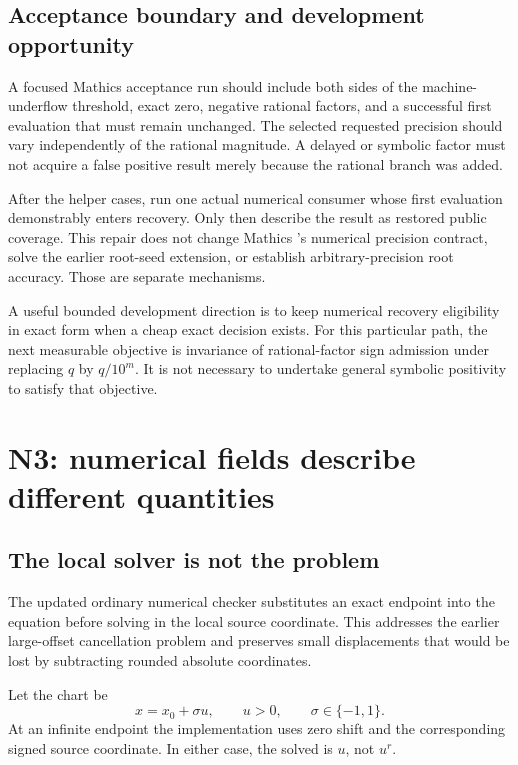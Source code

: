 \documentclass[11pt,letterpaper]{article}
\newcommand{\code}[1]{\texttt{\detokenize{#1}}}
\begin{document}
\subsection{Acceptance boundary and development opportunity}
A focused Mathics acceptance run should include both sides of the machine-underflow threshold, exact zero, negative rational factors, and a successful first evaluation that must remain unchanged. The selected requested precision should vary independently of the rational magnitude. A delayed or symbolic factor must not acquire a false positive result merely because the rational branch was added.

After the helper cases, run one actual numerical consumer whose first evaluation demonstrably enters recovery. Only then describe the result as restored public coverage. This repair does not change Mathics \code{FindRoot}'s numerical precision contract, solve the earlier root-seed extension, or establish arbitrary-precision root accuracy. Those are separate mechanisms.~\cite{mathicsnum,wave4,wave5}

A useful bounded development direction is to keep numerical recovery eligibility in exact form when a cheap exact decision exists. For this particular path, the next measurable objective is invariance of rational-factor sign admission under replacing $q$ by $q/10^m$. It is not necessary to undertake general symbolic positivity to satisfy that objective.

\section{N3: numerical fields describe different quantities}
\label{sec:n3}

\subsection{The local solver is not the problem}
The updated ordinary numerical checker substitutes an exact endpoint into the equation before solving in the local source coordinate. This addresses the earlier large-offset cancellation problem and preserves small displacements that would be lost by subtracting rounded absolute coordinates.~\cite{numchecks,status}

Let the chart be
\[
 x=x_0+\sigma u,\qquad u>0,\qquad \sigma\in\{-1,1\}.
\]
At an infinite endpoint the implementation uses zero shift and the corresponding signed source coordinate. In either case, the solved \code{localRoot} is $u$, not $u^r$.
\end{document}
